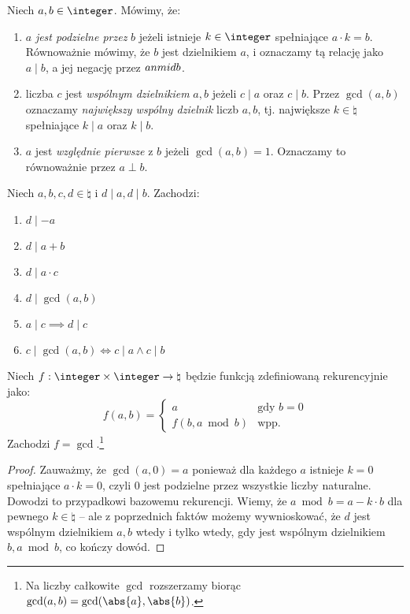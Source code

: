 
\begin{definition}[Notacja]
	Niech $a, b \in \integer$. Mówimy, że:
	\begin{enumerate}
		\item $a$ \textit{jest podzielne przez} $b$ jeżeli istnieje $k \in \integer$
		      spełniające $a \cdot k = b$. Równoważnie mówimy, że $b$ jest dzielnikiem $a$,
		      i oznaczamy tą relację jako $a \mid b$, a jej negację przez $a \\nmid b$.
		\item liczba $c$ jest \textit{wspólnym dzielnikiem} $a, b$ jeżeli $c \mid a$ oraz $c \mid b$.
		      Przez $\gcd(a, b)$ oznaczamy \textit{największy wspólny dzielnik} liczb $a, b$, tj. największe
		      $k \in \natural$ spełniające $k \mid a$ oraz $k \mid b$.
		\item $a$ jest \textit{względnie pierwsze} z $b$ jeżeli $\gcd(a, b) = 1$.
		      Oznaczamy to równoważnie przez $a \perp b$.
	\end{enumerate}
\end{definition}

\begin{fact}
	Niech $a, b, c, d \in \natural$ i $d \mid a, d \mid b$. Zachodzi:
	\begin{enumerate}
		\item $d \mid -a$
		\item $d \mid a+b$
		\item $d \mid a\cdot c$
		\item $d \mid \gcd(a, b)$
		\item $a \mid c \implies d \mid c$
		\item $c \mid \gcd(a, b) \iff c \mid a \land c \mid b$
	\end{enumerate}
\end{fact}

\begin{theorem}
	\label{nt:euklides}
	Niech $f: \integer \times \integer \to \natural$ będzie funkcją zdefiniowaną rekurencyjnie jako:
	\begin{equation*}
		f(a, b) = \begin{cases}
			a                & \text{gdy } b = 0 \\
			f(b, a \bmod{b}) & \text{wpp.}
		\end{cases}
	\end{equation*}
	Zachodzi $f = \gcd$.\footnote{Na liczby całkowite $\gcd$ rozszerzamy biorąc $\gcd(a, b) = \gcd(\abs{a}, \abs{b})$.}
\end{theorem}
\begin{proof}
	Zauważmy, że $\gcd(a, 0) = a$ ponieważ dla każdego $a$ istnieje $k = 0$ spełniające $a \cdot k = 0$, czyli $0$ jest podzielne przez wszystkie liczby naturalne.
	Dowodzi to przypadkowi bazowemu rekurencji.
	Wiemy, że $a \bmod b = a - k \cdot b$ dla pewnego $k \in \natural$ -- ale
	z poprzednich faktów możemy wywnioskować, że $d$ jest wspólnym dzielnikiem $a, b$
	wtedy i tylko wtedy, gdy jest wspólnym dzielnikiem $b, a \bmod b$, co kończy dowód.
\end{proof}

